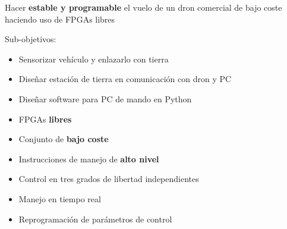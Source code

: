 \documentclass[a4,landscpae]{seminar}
\begin{document}
\begin{hslide}
Hacer \textbf{estable y programable} el vuelo de un dron comercial de
bajo coste haciendo uso de FPGAs libres

Sub-objetivos:
	\begin{itemize}
		\item Sensorizar veh\'iculo y enlazarlo con tierra
		\item Dise\~nar estaci\'on de tierra en comunicaci\'on con dron y PC
		\item Dise\~nar software para PC de mando en Python
	\end{itemize}
\end{hslide}
\begin{hslide}
	\begin{itemize}
		\item FPGAs \textbf{libres}
		\item Conjunto de \textbf{bajo coste}
		\item Instrucciones de manejo de \textbf{alto nivel}
		\item Control en tres grados de libertad independientes
		\item Manejo en tiempo real
		\item Reprogramaci\'on de par\'ametros de control
	\end{itemize}
\end{hslide}
\end{document}
